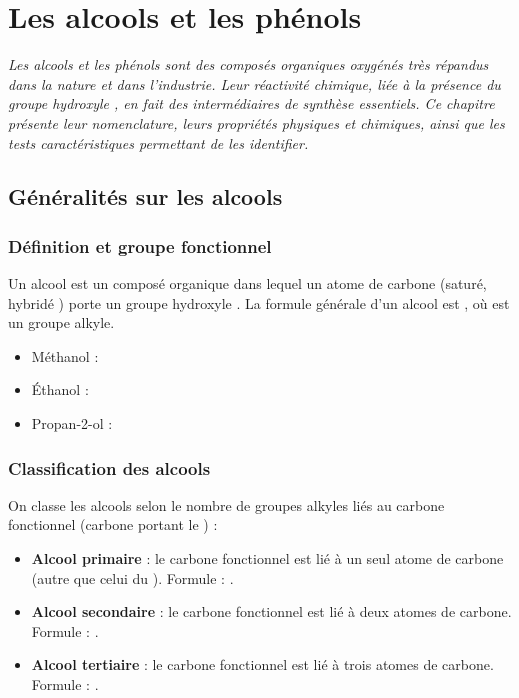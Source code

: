 \chapter{Les alcools et les phénols}

\textit{Les alcools et les phénols sont des composés organiques oxygénés très répandus dans la nature et dans l'industrie. Leur réactivité chimique, liée à la présence du groupe hydroxyle , en fait des intermédiaires de synthèse essentiels. Ce chapitre présente leur nomenclature, leurs propriétés physiques et chimiques, ainsi que les tests caractéristiques permettant de les identifier.}

\section{Généralités sur les alcools}

\subsection{Définition et groupe fonctionnel}

\begin{definition}[Alcool]
Un alcool est un composé organique dans lequel un atome de carbone (saturé, hybridé ) porte un groupe hydroxyle . La formule générale d'un alcool est , où  est un groupe alkyle.
\end{definition}

\begin{exemple}
\begin{itemize}
\item Méthanol : 
\item Éthanol : 
\item Propan-2-ol : 
\end{itemize}
\end{exemple}

\subsection{Classification des alcools}

\begin{propriete}
On classe les alcools selon le nombre de groupes alkyles liés au carbone fonctionnel (carbone portant le ) :
\begin{itemize}
\item \textbf{Alcool primaire} : le carbone fonctionnel est lié à un seul atome de carbone (autre que celui du ). Formule : .
\item \textbf{Alcool secondaire} : le carbone fonctionnel est lié à deux atomes de carbone. Formule : .
\item \textbf{Alcool tertiaire} : le carbone fonctionnel est lié à trois atomes de carbone. Formule : .
\end{itemize}
\end{propriete}

